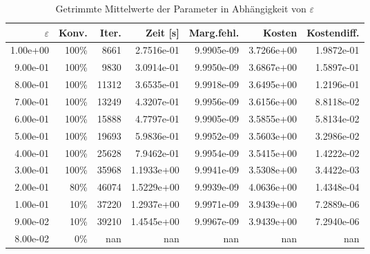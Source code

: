 \begin{table}[htbp]
\caption{Getrimmte Mittelwerte der Parameter in Abhängigkeit von $\varepsilon$}
\label{tab:Parametertest256_tol1e-08}
\small
\centering
{}
\begin{tabular}{rrrrrrr}
\toprule
$\varepsilon$ & Konv. & Iter. & Zeit [s] & Marg.fehl. & Kosten & Kostendiff. \\
\midrule
1.00e+00 & 100\% & 8661 & 2.7516e-01 & 9.9905e-09 & 3.7266e+00 & 1.9872e-01 \\
9.00e-01 & 100\% & 9830 & 3.0914e-01 & 9.9950e-09 & 3.6867e+00 & 1.5897e-01 \\
8.00e-01 & 100\% & 11312 & 3.6535e-01 & 9.9918e-09 & 3.6495e+00 & 1.2196e-01 \\
7.00e-01 & 100\% & 13249 & 4.3207e-01 & 9.9956e-09 & 3.6156e+00 & 8.8118e-02 \\
6.00e-01 & 100\% & 15888 & 4.7797e-01 & 9.9905e-09 & 3.5855e+00 & 5.8134e-02 \\
5.00e-01 & 100\% & 19693 & 5.9836e-01 & 9.9952e-09 & 3.5603e+00 & 3.2986e-02 \\
4.00e-01 & 100\% & 25628 & 7.9462e-01 & 9.9954e-09 & 3.5415e+00 & 1.4222e-02 \\
3.00e-01 & 100\% & 35968 & 1.1933e+00 & 9.9941e-09 & 3.5308e+00 & 3.4422e-03 \\
2.00e-01 & 80\% & 46074 & 1.5229e+00 & 9.9939e-09 & 4.0636e+00 & 1.4348e-04 \\
1.00e-01 & 10\% & 37220 & 1.2937e+00 & 9.9971e-09 & 3.9439e+00 & 7.2889e-06 \\
9.00e-02 & 10\% & 39210 & 1.4545e+00 & 9.9967e-09 & 3.9439e+00 & 7.2940e-06 \\
8.00e-02 & 0\% & nan & nan & nan & nan & nan \\
\bottomrule
\end{tabular}
\end{table}
